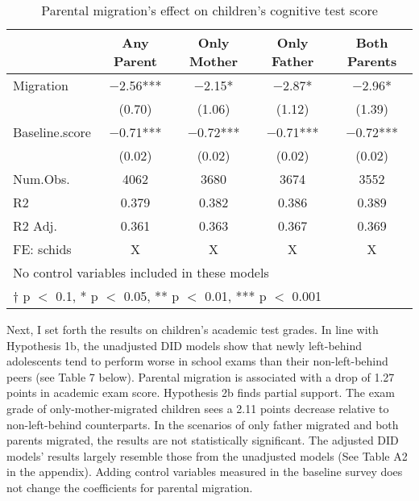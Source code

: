 \documentclass[
  man,floatsintext]{apa7}
\begin{document}
\begin{table}

\caption{Parental migration’s effect on children’s cognitive test score}
\centering
\begin{tabular}[t]{lcccc}
\toprule
  & Any Parent & Only Mother & Only Father & Both Parents\\
\midrule
Migration & \num{-2.56}*** & \num{-2.15}* & \num{-2.87}* & \num{-2.96}*\\
 & (\num{0.70}) & (\num{1.06}) & (\num{1.12}) & (\num{1.39})\\
Baseline.score & \num{-0.71}*** & \num{-0.72}*** & \num{-0.71}*** & \num{-0.72}***\\
 & (\num{0.02}) & (\num{0.02}) & (\num{0.02}) & (\num{0.02})\\
\midrule
Num.Obs. & \num{4062} & \num{3680} & \num{3674} & \num{3552}\\
R2 & \num{0.379} & \num{0.382} & \num{0.386} & \num{0.389}\\
R2 Adj. & \num{0.361} & \num{0.363} & \num{0.367} & \num{0.369}\\
FE: schids & X & X & X & X\\
\bottomrule
\multicolumn{5}{l}{\rule{0pt}{1em}No control variables included in these models}\\
\multicolumn{5}{l}{\rule{0pt}{1em}† p $<$ 0.1, * p $<$ 0.05, ** p $<$ 0.01, *** p $<$ 0.001}\\
\end{tabular}
\end{table}

Next, I set forth the results on children's academic test grades. In line with Hypothesis 1b, the unadjusted DID models show that newly left-behind adolescents tend to perform worse in school exams than their non-left-behind peers (see Table 7 below). Parental migration is associated with a drop of 1.27 points in academic exam score. Hypothesis 2b finds partial support. The exam grade of only-mother-migrated children sees a 2.11 points decrease relative to non-left-behind counterparts. In the scenarios of only father migrated and both parents migrated, the results are not statistically significant. The adjusted DID models' results largely resemble those from the unadjusted models (See Table A2 in the appendix). Adding control variables measured in the baseline survey does not change the coefficients for parental migration.

\newpage
\end{document}
